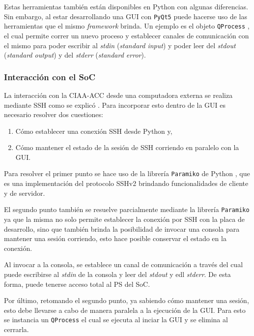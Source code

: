 \documentclass[../../main.tex]{subfiles}
\begin{document}
Estas herramientas también están disponibles en Python con algunas diferencias. Sin embargo, al estar desarrollando una GUI con \texttt{PyQt5} puede hacerse uso de las herramientas que el mismo \textit{framework} brinda. Un ejemplo es el objeto \texttt{QProcess} \cite{qprocess}, el cual permite correr un nuevo proceso y establecer canales de comunicación con el mismo para poder escribir al \textit{stdin} (\textit{standard input}) y poder leer del \textit{stdout} (\textit{standard output}) y del \textit{stderr} (\textit{standard error}).

\subsubsection{Interacción con el SoC}
La interacción con la CIAA-ACC desde una computadora externa se realiza mediante SSH como se explicó . Para incorporar esto dentro de la GUI es necesario resolver dos cuestiones:
\begin{enumerate}
    \item Cómo establecer una conexión SSH desde Python y,
    \item Cómo mantener el estado de la sesión de SSH corriendo en paralelo con la GUI.
\end{enumerate}

Para resolver el primer punto se hace uso de la librería \texttt{Paramiko} de Python \cite{paramiko}, que es una implementación del protocolo SSHv2 brindando funcionalidades de cliente y de servidor.

El segundo punto también se resuelve parcialmente mediante la librería \texttt{Paramiko} ya que la misma no solo permite establecer la conexión por SSH con la placa de desarrollo, sino que también brinda la posibilidad de invocar una consola para mantener una sesión corriendo, esto hace posible conservar el estado en la conexión. 

Al invocar a la consola, se establece un canal de comunicación a través del cual puede escribirse al \textit{stdin} de la consola y leer del \textit{stdout} y edl \textit{stderr}. De esta forma, puede tenerse acceso total al PS del SoC.

Por último, retomando el segundo punto, ya sabiendo cómo mantener una sesión, esto debe llevarse a cabo de manera paralela a la ejecución de la GUI. Para esto se instancia un \texttt{QProcess} el cual se ejecuta al inciar la GUI y se elimina al cerrarla.
\end{document}
